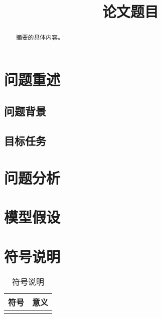 \documentclass{cumcmthesis}
\title{论文题目}
\begin{document}
\maketitle %


\begin{abstract}

    摘要的具体内容。

\end{abstract}

\tableofcontents %

\section{问题重述}

    \subsection{问题背景}

    \subsection{目标任务}

\section{问题分析}

\section{模型假设}

\section{符号说明}
    \begin{table}[!h]
        \centering
        \caption{符号说明}
        \setlength\tabcolsep{60pt} %
        \begin{tabularx}{\textwidth}{XX}
            \toprule[1.5pt]
            符号 & 意义\\
            \midrule[1pt]
             & \\
            \bottomrule[1.5pt]
        \end{tabularx}
    \end{table}
\end{document}
